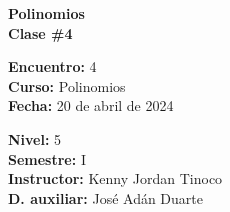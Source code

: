 \begin{center} \textbf
{
    \Large Polinomios\\ \vspace{2mm}Clase \#4
}
\end{center}

\begin{multicols}{2}
{
    \textbf{Encuentro:} 4\\
    \textbf{Curso:} Polinomios\\
    \textbf{Fecha:} 20 de abril de 2024\\
    \begin{flushright}
        \textbf{Nivel:} 5\\
        \textbf{Semestre:} I\\
        \textbf{Instructor:} Kenny Jordan Tinoco\\
        \textbf{D. auxiliar: }José Adán Duarte
    \end{flushright}
}
\end{multicols}

\thispagestyle{first-page-style}